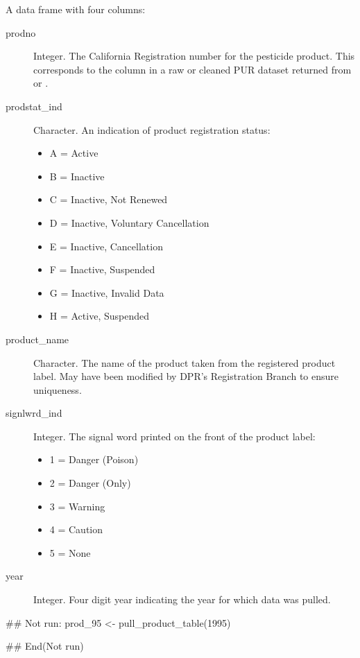 \documentclass[a4paper]{book}
\begin{document}
%
\begin{Value}
A data frame with four columns:
\begin{description}

\item[prodno] Integer. The California Registration number for the pesticide
product. This corresponds to the  column in a raw or cleaned PUR
dataset returned from  or .
\item[prodstat\_ind] Character. An indication of product registration status:
\begin{itemize}

\item A = Active
\item B = Inactive
\item C = Inactive, Not Renewed
\item D = Inactive, Voluntary Cancellation
\item E = Inactive, Cancellation
\item F = Inactive, Suspended
\item G = Inactive, Invalid Data
\item H = Active, Suspended
\end{itemize}

\item[product\_name] Character. The name of the product taken from the
registered product label. May have been modified by DPR's Registration Branch
to ensure uniqueness.
\item[signlwrd\_ind] Integer. The signal word printed on the front of the
product label:
\begin{itemize}

\item 1 = Danger (Poison)
\item 2 = Danger (Only)
\item 3 = Warning
\item 4 = Caution
\item 5 = None
\end{itemize}

\item[year] Integer. Four digit year indicating the year for which data was
pulled.

\end{description}

\end{Value}
%
\begin{Examples}
\begin{ExampleCode}
## Not run:
prod_95 <- pull_product_table(1995)

## End(Not run)
\end{ExampleCode}
\end{Examples}
\end{document}
